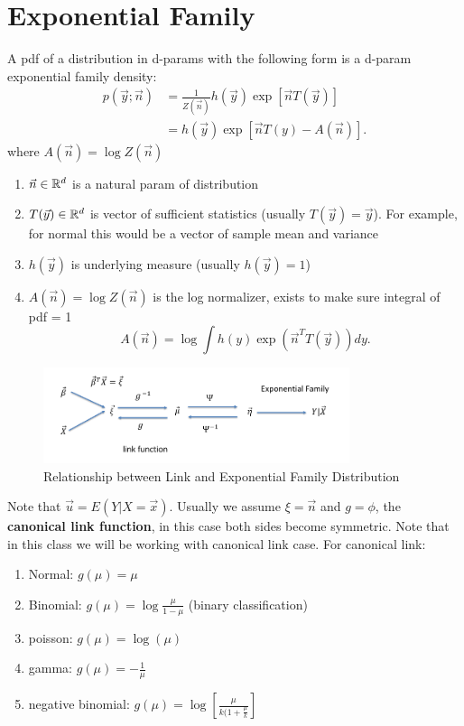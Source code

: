 \documentclass[a4paper]{article}
\begin{document}
\section{Exponential Family}
\begin{definition}
  A pdf of a distribution in d-params with the following form is a d-param exponential family density:
  \begin{align*}
     p(\vec{y}; \vec{n}) &= \frac{1}{Z(\vec{n})} h(\vec{y}) \exp [\vec{n} T(\vec{y})] \\
                        &= h(\vec{y}) \exp [\vec{n} T(y) - A(\vec{n})] 
  .\end{align*}
      where $A(\vec{n}) = \log Z(\vec{n})$
  \begin{enumerate}
    \item $\vec{n} \in \mathbb{R}^d$ is a natural param of distribution
    \item $T(\vec{y}) \in \mathbb{R}^d$ is vector of sufficient statistics (usually $T(\vec{y}) = \vec{y}$). 
      For example, for normal this would be a vector of sample mean and variance
    \item $h(\vec{y})$ is underlying measure (usually $h(\vec{y}) = 1$) 
    \item $A(\vec{n}) = \log Z(\vec{n})$ is the log normalizer, exists to make sure integral of pdf = 1
      \[
        A(\vec{n}) = \log \int h(y) \exp(\vec{n}^T T(\vec{y})) dy
      .\] 
  \end{enumerate}
\end{definition}
\begin{figure}[h]
  \centering
  \includegraphics[width=0.8\textwidth]{assets/link_and_exponential.png}
  \caption{Relationship between Link and Exponential Family Distribution}
  \label{fig:link_and_exponential}
\end{figure}
Note that $\vec{u} = E(Y | X =\vec{x})$. Usually we assume $\xi = \vec{n}$ and  $g = \phi$, the \textbf{canonical link function},
in this case both sides become symmetric. Note that in this class we will be working with canonical link case. For 
canonical link:
\begin{enumerate}
  \item Normal: $g(\mu) = \mu$
  \item Binomial:  $g(\mu) = \log \frac{\mu}{1-\mu}$ (binary classification)
  \item poisson: $g(\mu) = \log(\mu)$
  \item gamma: $g(\mu) = - \frac{1}{\mu}$ 
  \item negative binomial: $g(\mu) = \log[\frac{\mu}{k(1+\frac{\mu}{k}}]$
\end{enumerate}
\end{document}

